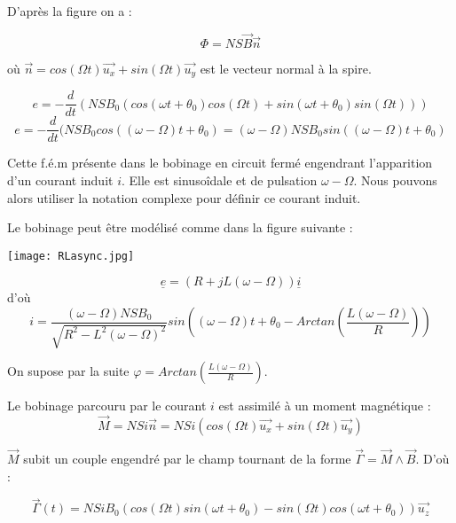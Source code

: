 \documentclass{article}
\begin{document}
D'après la figure on a :

\begin{equation}
    \Phi = NS\vec{B} \vec{n}
\end{equation}

où $\vec{n} = cos(\Omega t) \vec{u_x} + sin(\Omega t)\vec{u_y}$ est le vecteur normal à la spire.

\begin{equation}
    e = - \frac{d}{dt} (NSB_0 (cos(\omega t + \theta_0)cos(\Omega t) + sin(\omega t +\theta_0) sin (\Omega t)))
\end{equation}
\begin{equation}
     e = - \frac{d}{dt} (NSB_0 cos((\omega -\Omega)t + \theta_0) = (\omega - \Omega)NSB_0 sin((\omega -\Omega)t + \theta_0)
\end{equation}

Cette f.é.m présente dans le bobinage en circuit fermé engendrant l'apparition d'un courant induit $i$. Elle est sinusoîdale et de pulsation $\omega -\Omega$. Nous pouvons alors utiliser la notation complexe pour définir ce courant induit. \medskip

Le bobinage peut être modélisé comme dans la figure suivante :

\begin{center}
    \texttt{[image: RLasync.jpg]}
\end{center}
 
\begin{equation}
    \underline{e} = (R + jL(\omega - \Omega)) \underline{i}
\end{equation}
d'où
\begin{equation}
    i = \frac{(\omega - \Omega)NSB_0}{\sqrt{R^2-L^2(\omega - \Omega)^2}} sin\left ( (\omega - \Omega)t + \theta_0 - Arctan \left ( \frac{L (\omega - \Omega)}{R} \right ) \right )
\end{equation}

On supose par la suite $\varphi = Arctan \left ( \frac{L (\omega - \Omega)}{R} \right )$.

Le bobinage parcouru par le courant $i$ est assimilé à un moment magnétique :
\begin{equation}
    \vec{M} = NSi\vec{n} = NSi(cos(\Omega t) \vec{u_x} + sin(\Omega t)\vec{u_y})
\end{equation}

$\vec{M}$ subit un couple engendré par le champ tournant de la forme $ \vec{\Gamma} = \vec{M} \land \vec{B} $. D'où :

\begin{equation}
    \vec{\Gamma}(t) = NSiB_0(cos(\Omega t) sin(\omega t + \theta_0) - sin(\Omega t)cos(\omega t + \theta_0))\vec{u_z}
\end{equation}
\end{document}
